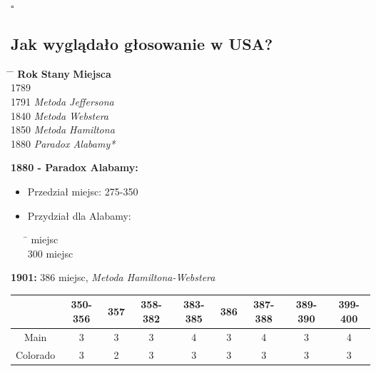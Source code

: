 \documentclass[12pt,a4paper]{article}
\theoremstyle{break}
\begin{document}
	\begin{flushright}
		$\square$
	\end{flushright}
	\newpage
	\subsection{Jak wyglądało głosowanie w USA?}
	
	\begin{tabbing}
		\hspace{4cm} \= \hspace{3cm} \= \kill
		\textbf{Rok} \> \textbf{Stany} \> \textbf{Miejsca} \\
		1789   \\
		1791   \quad \textit{Metoda Jeffersona} \\
		1840 \>  \quad \textit{Metoda Webstera} \\
		1850 \>  \quad \textit{Metoda Hamiltona} \\
		1880 \>  \quad \textit{Paradox Alabamy*} \\
	\end{tabbing}
	
	\noindent \textbf{1880 - Paradox Alabamy:}
	
	\begin{itemize}
		\item Przedział miejsc: 275-350
		\item Przydział dla Alabamy:
		\begin{tabbing}
			\hspace{2cm} \= \hspace{3cm}   miejsc \\
			300  miejsc \\
		\end{tabbing}
	\end{itemize}
	
	\noindent \textbf{1901:} 386 miejsc, \textit{Metoda Hamiltona-Webstera}
	
	\begin{center}
		\begin{tabular}{|c|c|c|c|c|c|c|c|c|}
			\hline
			& 350-356 & 357 & 358-382 & 383-385 & 386 & 387-388 & 389-390 & 399-400 \\
			\hline
			Main & 3 & 3 & 3 & 4 & 3 & 4 & 3 & 4 \\
			\hline
			Colorado & 3 & 2 & 3 & 3 & 3 & 3 & 3 & 3 \\
			\hline
		\end{tabular}
	\end{center}
	
\end{document}
